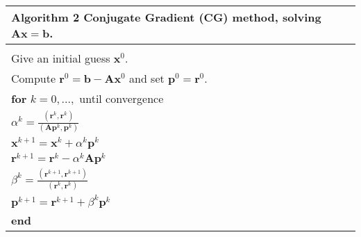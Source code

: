 \documentclass[12pt]{article}
\begin{document}
 \begin{table}[!h]
\begin{tabular}{ |l| } 
\hline
  \textbf{Algorithm 2} Conjugate Gradient (CG) method, solving $\mathbf{A}\mathbf{x}=\mathbf{b}$.\\
  \hline
 \hline
\\
Give an initial guess $\mathbf{x}^0$. \\Compute $\mathbf{r}^0=\mathbf{b}-\mathbf{A}\mathbf{x}^0$ and set $\mathbf{p}^0=\mathbf{r}^0$.\\

\hspace{0.5cm}\textbf{for} $k=0,...,$ until convergence\\
 \hspace{1cm} $\alpha^k=\frac{(\mathbf{r}^{k},\mathbf{r}^{k})}{(\mathbf{A}\mathbf{p}^k,\mathbf{p}^k)}$\\
\hspace{1cm} $\mathbf{x}^{k+1}=\mathbf{x}^k+\alpha^k\mathbf{p}^k$\\
\hspace{1cm}$\mathbf{r}^{k+1}=\mathbf{r}^k-\alpha^k\mathbf{A}\mathbf{p}^k$\\
\hspace{1cm}$ \beta^k=\frac{(\mathbf{r}^{k+1},\mathbf{r}^{k+1})}{(\mathbf{r}^k,\mathbf{r}^k)}$\\
\hspace{1cm}$\mathbf{p}^{k+1}=\mathbf{r}^{k+1}+\beta^k\mathbf{p}^k$\\
\hspace{0.5cm}\textbf{end}\\
\hline
\end{tabular}
\end{table}
\end{document}
